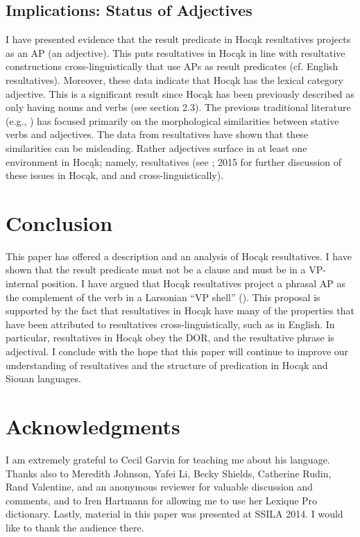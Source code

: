 \documentclass[output=paper]{LSP/langsci}
\begin{document}
\subsection{Implications: Status of Adjectives}

I have presented evidence that the result predicate in Hocąk resultatives projects as an AP (an adjective). This puts resultatives in Hocąk in line with resultative constructions cross-linguistically that use APs as result predicates (cf. English resultatives). Moreover, these data indicate that Hocąk has the lexical category adjective. This is a significant result since Hocąk has been previously described as only having nouns and verbs (see section 2.3). The previous traditional literature (e.g., \citealt{Helmbrecht2006}) has focused primarily on the morphological similarities between stative verbs and adjectives. The data from resultatives have shown that these similarities can be misleading. Rather adjectives surface in at least one environment in Hocąk; namely, resultatives (see \citealt{Rosen2014}; 2015 for further discussion of these issues in Hocąk, and \citealt{Baker2003} and \citealt{Dixon2004} cross-linguistically).

\section{Conclusion}
This paper has offered a description and an analysis of Hocąk resultatives. I have shown that the result predicate must not be a clause and must be in a VP-internal position. I have argued that Hocąk resultatives project a phrasal AP as the complement of the verb in a Larsonian ``VP shell'' (\citealt{Larson1988}). This proposal is supported by the fact that resultatives in Hocąk have many of the properties that have been attributed to resultatives cross-linguistically, such as in English. In particular, resultatives in Hocąk obey the DOR, and the resultative phrase is adjectival. I conclude with the hope that this paper will continue to improve our understanding of resultatives and the structure of predication in Hocąk and Siouan languages.

\section* {Acknowledgments}
I am extremely grateful to Cecil Garvin for teaching me about his language. Thanks also to Meredith Johnson, Yafei Li, Becky Shields, Catherine Rudin, Rand Valentine, and an anonymous reviewer for valuable discussion and comments, and to Iren Hartmann for allowing me to use her Lexique Pro dictionary. Lastly, material in this paper was presented at SSILA 2014. I would like to thank the audience there.
\end{document}
